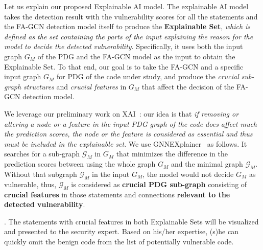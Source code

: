 Let us explain our proposed Explainable AI model.  The explainable AI model takes the detection result with
the vulnerability scores for all the statements and the FA-GCN
detection model itself to produce the {\bf Explainable Set}, {\em
  which is defined as the set containing the parts of the input
  explaining the reason for the model to decide the detected
  vulnerability}. Specifically, it uses both the input graph $G_M$ of
the PDG and the FA-GCN model as the input to obtain the Explainable
Set.  To that end, our goal is to take the FA-GCN and a specific input
graph $G_M$ for PDG of the code under study, and produce the {\em
  crucial sub-graph structures} and {\em crucial features} in $G_M$
that affect the decision of the FA-GCN detection model.

We leverage our preliminary work on XAI~\cite{fse21-submission}: our
idea is that {\em if removing or altering a node or a feature in the
  input PDG graph of the code does affect much the prediction scores,
  the node or the feature is considered as essential and thus must be
  included in the explainable set}. We use
GNNEXplainer~\cite{GNNExplainer} as follows. It searches for a
sub-graph $\mathcal{G}_M$ in $G_M$ that minimizes the difference in
the prediction scores between using the whole graph $G_M$ and the
minimal graph $\mathcal{G}_M$. Without that subgraph $\mathcal{G}_M$
in the input $G_M$, the model would not decide $G_M$ as vulnerable,
thus, $\mathcal{G}_M$ is considered as {\bf crucial PDG sub-graph}
consisting of {\bf crucial features} in those statements and
connections {\bf relevant to the detected vulnerability}.

.  The
statements with crucial features in both Explainable Sets will be
visualized and presented to the security expert. Based on his/her
expertise, (s)he can quickly omit the benign code from the list of
potentially vulnerable code.


   

